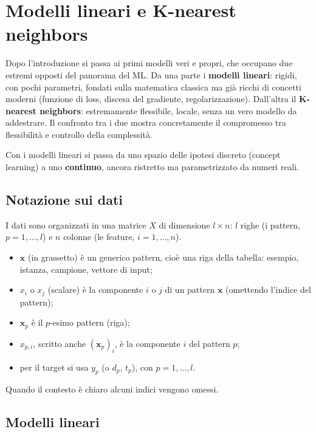 \chapter{Modelli lineari e K-nearest neighbors}\label{ch-05}

Dopo l'introduzione si passa ai primi modelli veri e propri, che
occupano due estremi opposti del panorama del ML. Da una parte i
\textbf{modelli lineari}: rigidi, con pochi parametri, fondati sulla
matematica classica ma già ricchi di concetti moderni (funzione di loss,
discesa del gradiente, regolarizzazione). Dall'altra il
\textbf{K-nearest neighbors}: estremamente flessibile, locale, senza un
vero modello da addestrare. Il confronto tra i due mostra concretamente
il compromesso tra flessibilità e controllo della complessità.

Con i modelli lineari si passa da uno spazio delle ipotesi discreto
(concept learning) a uno \textbf{continuo}, ancora ristretto ma
parametrizzato da numeri reali.

\section{Notazione sui dati}\label{notazione-sui-dati}

I dati sono organizzati in una matrice \(X\) di dimensione
\(l \times n\): \(l\) righe (i pattern, \(p = 1,\dots,l\)) e \(n\)
colonne (le feature, \(i = 1,\dots,n\)).

\begin{itemize}
\tightlist
\item
  \(\mathbf{x}\) (in grassetto) è un generico pattern, cioè una riga
  della tabella: esempio, istanza, campione, vettore di input;
\item
  \(x_i\) o \(x_j\) (scalare) è la componente \(i\) o \(j\) di un
  pattern \(\mathbf{x}\) (omettendo l'indice del pattern);
\item
  \(\mathbf{x}_p\) è il \(p\)-esimo pattern (riga);
\item
  \(x_{p,i}\), scritto anche \((\mathbf{x}_p)_i\), è la componente \(i\)
  del pattern \(p\);
\item
  per il target si usa \(y_p\) (o \(d_p\), \(t_p\)), con
  \(p = 1,\dots,l\).
\end{itemize}

Quando il contesto è chiaro alcuni indici vengono omessi.

\section{Modelli lineari}\label{modelli-lineari}

